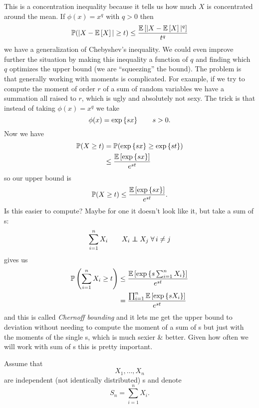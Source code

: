 \documentclass[12pt]{report}
\begin{document}
This is a concentration inequality because it tells us how much $X$ is concentrated around the mean. If $\phi(x)=x^{q}$ with $q>0$ then
\begin{equation*}
	\mathbb{P}(|X-\mathbb{E}\left[X\right]|\geq t)\leq\frac{\mathbb{E}\left[|X-\mathbb{E}\left[X\right]|^{q}\right]}{t^{q}}
\end{equation*}
we have a generalization of Chebyshev's inequality. We could even improve further the situation by making this inequality a function of $q$ and finding which $q$ optimizes the upper bound (we are ``squeezing'' the bound). The problem is that generally working with moments is complicated. For example, if we try to compute the moment of order $r$ of a sum of random variables we have a summation all raised to $r$, which is ugly and absolutely not sexy. The trick is that instead of taking $\phi(x)=x^{q}$ we take
\begin{equation*}
	\phi(x)=\exp\left\{sx\right\}\qquad s>0.
\end{equation*}
Now we have
\begin{align*}
	\mathbb{P}(X\geq t)&=\mathbb{P}(\exp\left\{sx\right\}\geq\exp\left\{st\right\})\\
	&\leq\frac{\mathbb{E}\left[\exp\left\{sx\right\}\right]}{e^{st}}
\end{align*}
so our upper bound is
\begin{equation*}
	\mathbb{P}(X\geq t)\leq\frac{\mathbb{E}\left[\exp\left\{sx\right\}\right]}{e^{st}}.
\end{equation*}
Is this easier to compute? Maybe for one \rv{} it doesn't look like it, but take a sum of \rv s:
\begin{equation*}
	\sum_{i=1}^{n}X_{i}\qquad X_{i}\indep X_{j}\;\every i\neq j
\end{equation*}
gives us
\begin{align*}
	\mathbb{P}\left(\sum_{i=1}^{n}X_{i}\geq t\right)&\leq\frac{\mathbb{E}\left[\exp\left\{s\sum_{i=1}^{n}X_{i}\right\}\right]}{e^{st}}\\
	&=\frac{\prod_{i=1}^{n}\mathbb{E}\left[\exp\left\{sX_{i}\right\}\right]}{e^{st}}
\end{align*}
and this is called \emph{Chernoff bounding} and it lets me get the upper bound to deviation without needing to compute the moment of a sum of \rv s but just with the moments of the single \rv s, which is much sexier \& better. Given how often we will work with sum of \rv s this is pretty important.\par
Assume that 
\begin{equation*}
	X_{1},\ldots,X_{n}
\end{equation*}
are independent (not identically distributed) \rv s and denote
\begin{equation*}
	S_{n}=\sum_{i=1}^{n}X_{i}.
\end{equation*}
\end{document}

